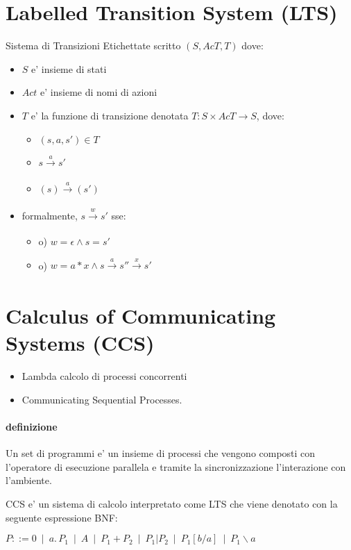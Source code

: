 \section{Labelled Transition System (LTS)}

Sistema di Transizioni Etichettate scritto $(S, AcT, T)$ dove:
\begin{itemize}
  \item $S$ e' insieme di stati
  \item $Act$ e' insieme di nomi di azioni
  \item $T$ e' la funzione di transizione denotata $T: S \times AcT \rightarrow S$, dove:
    \begin{itemize}
      \item $(s, a, s') \in T$
      \item $s \xrightarrow[]{a} s'$
      \item $(s) \xrightarrow[]{a} (s')$
    \end{itemize}
  \item formalmente, $s \xrightarrow[]{w} s'$ sse:
  \begin{itemize}
    \item o) $w = \epsilon \land s = s'$
    \item o) $w = a*x \land s \xrightarrow[]{a} s'' \xrightarrow[]{x} s'$
  \end{itemize}
\end{itemize}

\section{Calculus of Communicating Systems (CCS)}

\begin{itemize}
  \item Lambda calcolo di processi concorrenti
  \item Communicating Sequential Processes.
\end{itemize}

\paragraph{definizione}
Un set di programmi e' un insieme di processi che vengono composti con l'operatore di esecuzione parallela e tramite la sincronizzazione l'interazione con l'ambiente.

CCS e' un sistema di calcolo interpretato come LTS che viene denotato con la seguente espressione BNF:

$
P ::= 0 \,\,\,
  | \,\,\, a. \, P_{1} \,\,\,
  | \,\,\, A\,\,\,
  | \,\,\, P_{1} + P_{2} \,\,\,
  | \,\,\, P_{1} | P_{2} \,\,\,
  | \,\,\, P_{1} [b/a] \,\,\,
  | \,\,\, P_{1} {\backslash }a \,\,\,
$

